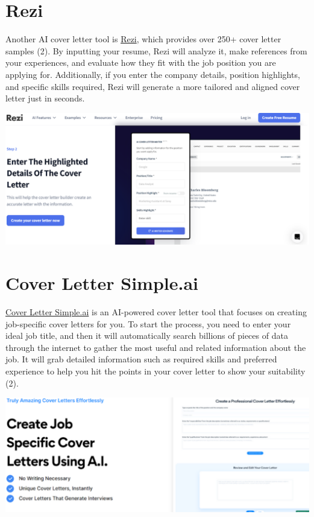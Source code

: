 \documentclass[
]{book}
\begin{document}
\hypertarget{rezi}{%
\section{Rezi}\label{rezi}}

Another AI cover letter tool is \href{https://www.rezi.ai/}{Rezi}, which provides over 250+ cover letter samples (2). By inputting your resume, Rezi will analyze it, make references from your experiences, and evaluate how they fit with the job position you are applying for. Additionally, if you enter the company details, position highlights, and specific skills required, Rezi will generate a more tailored and aligned cover letter just in seconds.~

\includegraphics[width=5.5in,height=\textheight]{Rezi pic.png}

\hypertarget{cover-letter-simple.ai}{%
\section{Cover Letter Simple.ai}\label{cover-letter-simple.ai}}

\href{https://coverlettersimple.ai/}{Cover Letter Simple.ai} is an AI-powered cover letter tool that focuses on creating job-specific cover letters for you. To start the process, you need to enter your ideal job title, and then it will automatically search billions of pieces of data through the internet to gather the most useful and related information about the job. It will grab detailed information such as required skills and preferred experience to help you hit the points in your cover letter to show your suitability (2).

\includegraphics[width=6.80208in,height=\textheight]{coverlettsimpleai pic.png}
\end{document}
